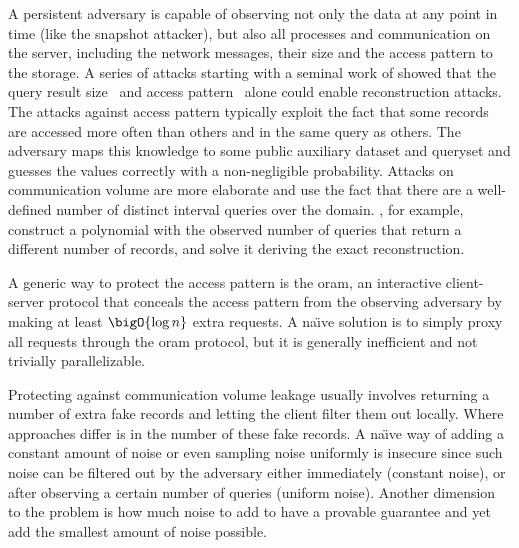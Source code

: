 			A persistent adversary is capable of observing not only the data at any point in time (like the snapshot attacker), but also all processes and communication on the server, including the network messages, their size and the access pattern to the storage.
			A series of attacks starting with a seminal work of \textcite{generic-attacks-kellaris} showed that the query result size~\cite{generic-attacks-kellaris, state-of-uniform, attacks-improved-reconstruction, pump-volume-attacks, volume-range-attacks} and access pattern~\cite{multidimensional-range-queries, inference-attack-islam-14, leakage-abuse-attacks-cash-15, inference-attacks-naveed-15, generic-attacks-kellaris, attacks-tao-of-inference, grubbs-attacks, access-pattern-disclosure, attacks-improved-reconstruction} alone could enable reconstruction attacks.
			The attacks against access pattern typically exploit the fact that some records are accessed more often than others and in the same query as others.
			The adversary maps this knowledge to some public auxiliary dataset and queryset and guesses the values correctly with a non-negligible probability.
			Attacks on communication volume are more elaborate and use the fact that there are a well-defined number of distinct interval queries over the domain.
			\textcite{generic-attacks-kellaris}, for example, construct a polynomial with the observed number of queries that return a different number of records, and solve it deriving the exact reconstruction.

			A generic way to protect the access pattern is the \acrfull{oram}, an interactive client-server protocol that conceals the access pattern from the observing adversary by making at least $\bigO{\log n}$ extra requests.
			A na\"{\i}ve solution is to simply proxy all requests through the \acrshort{oram} protocol, but it is generally inefficient and not trivially parallelizable.

			Protecting against communication volume leakage usually involves returning a number of extra fake records and letting the client filter them out locally.
			Where approaches differ is in the number of these fake records.
			A na\"{\i}ve way of adding a constant amount of noise or even sampling noise uniformly is insecure since such noise can be filtered out by the adversary either immediately (constant noise), or after observing a certain number of queries (uniform noise).
			Another dimension to the problem is how much noise to add to have a provable guarantee and yet add the smallest amount of noise possible.

